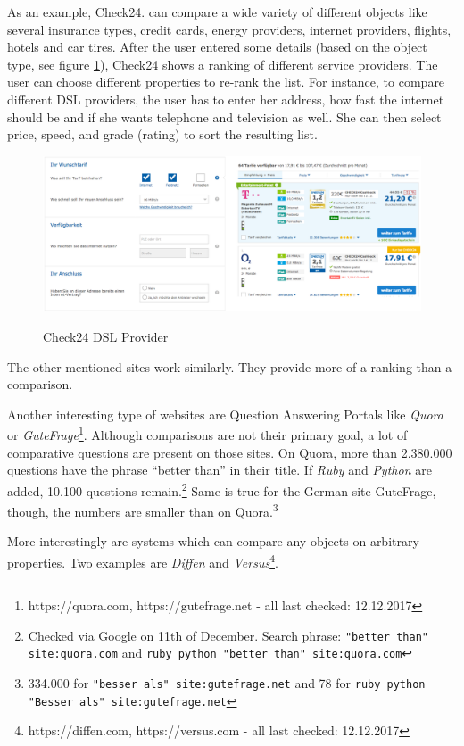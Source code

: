 As an example, Check24. can compare a wide variety of different objects like several insurance types, credit cards, energy providers, internet providers, flights, hotels and car tires. After the user entered some details (based on the object type, see figure \ref{img:check24}), Check24 shows a ranking of different service providers. The user can choose different properties to re-rank the list.
For instance, to compare different DSL providers, the user has to enter her address, how fast the internet should be and if she wants telephone and television as well. She can then select price, speed, and grade (rating) to sort the resulting list.

\begin{figure}[h]
\includegraphics[width=1\textwidth]{images/ds-sys/check24}
\label{img:check24}
\caption{Check24 DSL Provider}
\end{figure}
The other mentioned sites work similarly. They provide more of a ranking than a comparison.\newline


Another interesting type of websites are Question Answering Portals like \emph{Quora} or \emph{GuteFrage}\footnote{https://quora.com, https://gutefrage.net - all last checked: 12.12.2017}. Although comparisons are not their primary goal, a lot of comparative questions are present on those sites.
On Quora, more than 2.380.000 questions have the phrase \enquote{better than} in their title. If \emph{Ruby} and \emph{Python} are added, 10.100 questions remain.\footnote{Checked via Google on 11th of December. Search phrase: \texttt{"better than" site:quora.com} and \texttt{ruby python "better than" site:quora.com}}
Same is true for the German site GuteFrage, though, the numbers are smaller than on Quora.\footnote{334.000 for \texttt{"besser als" site:gutefrage.net} and 78 for \texttt{ruby python "Besser als" site:gutefrage.net}}\newline

More interestingly are systems which can compare any objects on arbitrary properties. Two examples are \emph{Diffen} and \emph{Versus}\footnote{https://diffen.com, https://versus.com - all last checked: 12.12.2017}.

